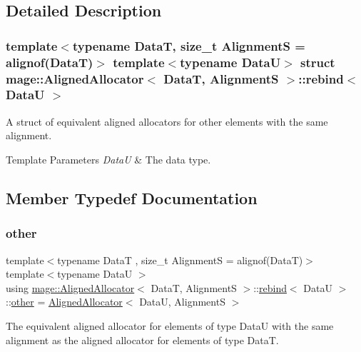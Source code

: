 \subsection{Detailed Description}
\subsubsection*{template$<$typename DataT, size\+\_\+t AlignmentS = alignof(\+Data\+T)$>$\newline
template$<$typename DataU$>$\newline
struct mage\+::\+Aligned\+Allocator$<$ Data\+T, Alignment\+S $>$\+::rebind$<$ Data\+U $>$}

A struct of equivalent aligned allocators for other elements with the same alignment. 
\begin{DoxyTemplParams}{Template Parameters}
{\em DataU} & The data type. \\
\hline
\end{DoxyTemplParams}


\subsection{Member Typedef Documentation}
\hypertarget{structmage_1_1_aligned_allocator_1_1rebind_aeb2e9c9add001b8f603f5b67ad8fee56}{}\label{structmage_1_1_aligned_allocator_1_1rebind_aeb2e9c9add001b8f603f5b67ad8fee56} 
\subsubsection{\texorpdfstring{other}{other}}
{\footnotesize\ttfamily template$<$typename DataT , size\+\_\+t AlignmentS = alignof(\+Data\+T)$>$ \\
template$<$typename DataU $>$ \\
using \hyperlink{classmage_1_1_aligned_allocator}{mage\+::\+Aligned\+Allocator}$<$ DataT, AlignmentS $>$\+::\hyperlink{structmage_1_1_aligned_allocator_1_1rebind}{rebind}$<$ DataU $>$\+::\hyperlink{structmage_1_1_aligned_allocator_1_1rebind_aeb2e9c9add001b8f603f5b67ad8fee56}{other} =  \hyperlink{classmage_1_1_aligned_allocator}{Aligned\+Allocator}$<$ DataU, AlignmentS $>$}

The equivalent aligned allocator for elements of type {\ttfamily DataU} with the same alignment as the aligned allocator for elements of type {\ttfamily DataT}. 

